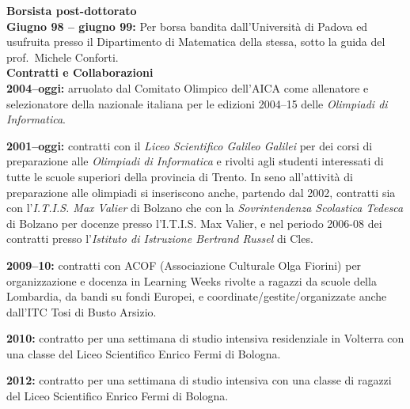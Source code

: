 \documentclass[10pt]{article}
\newcommand{\subvoice}[1] { {\large \bf #1} \smallskip\\ }
\begin{document}
\subvoice{Borsista post-dottorato}
{\bf Giugno 98 -- giugno 99:}
Per borsa
bandita dall'Universit\`a di Padova
ed usufruita
presso il Dipartimento di Matematica 
della stessa,
sotto la guida del prof.~Michele Conforti.\\


\subvoice{Contratti e Collaborazioni}
{\bf 2004--oggi:} arruolato dal Comitato Olimpico dell'AICA
come allenatore e selezionatore
della nazionale italiana per le edizioni 2004--15
delle {\em Olimpiadi di Informatica}.

\noindent
{\bf 2001--oggi:}
contratti con il {\em Liceo Scientifico Galileo Galilei}
per dei corsi di preparazione alle {\em Olimpiadi di Informatica}
e rivolti agli studenti interessati
di tutte le scuole superiori della provincia di Trento.
In seno all'attivit\`a di preparazione alle olimpiadi
si inseriscono anche,
partendo dal 2002, contratti
sia con l'{\em I.T.I.S.
Max Valier} di Bolzano che
con la {\em Sovrintendenza Scolastica Tedesca} di Bolzano
per docenze presso l'I.T.I.S.
Max Valier,
e nel periodo 2006-08 dei contratti presso
l'{\em Istituto di Istruzione Bertrand Russel} di Cles.
%

\noindent
{\bf 2009--10:}
contratti con ACOF (Associazione Culturale Olga Fiorini)
per organizzazione e docenza
in Learning Weeks rivolte a ragazzi da scuole della Lombardia,
da bandi su fondi Europei,
e coordinate/gestite/organizzate anche dall'ITC Tosi di Busto Arsizio.


\noindent
{\bf 2010:}
contratto per una settimana di studio intensiva residenziale in Volterra
con una classe del Liceo Scientifico Enrico Fermi di Bologna. 

\noindent
{\bf 2012:}
contratto per una settimana di studio intensiva
con una classe di ragazzi del Liceo Scientifico Enrico Fermi di Bologna. 
\end{document}
